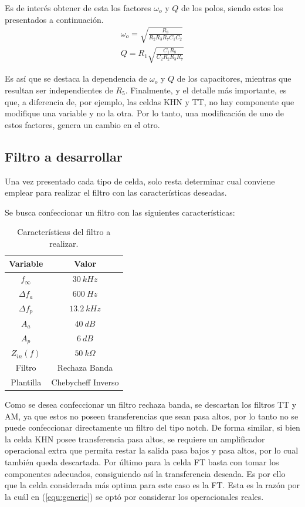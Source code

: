 Es de interés obtener de esta los factores $\omega_o$ y $Q$ de los polos, siendo estos los presentados a continuación.
\begin{equation}
\begin{split}
	\omega_o = \sqrt{\frac{R_8}{R_2 R_3 R_7 C_1 C_2}} \\
	Q = R_1 \sqrt{\frac{C_1 R_8}{C_2 R_2 R_3 R_7}} 
\end{split}
\label{equ:woq-ft}
\end{equation}

Es así que se destaca la dependencia de $\omega_o$ y $Q$ de los capacitores, mientras que resultan ser independientes de $R_5$. Finalmente, y el detalle más importante, es que, a diferencia de, por ejemplo, las celdas KHN y TT, no hay componente que modifique una variable y no la otra. Por lo tanto, una modificación de uno de estos factores, genera un cambio en el otro.

\subsection{Filtro a desarrollar}
Una vez presentado cada tipo de celda, solo resta determinar cual conviene emplear para realizar el filtro con las características deseadas.

Se busca confeccionar un filtro con las siguientes características:
\begin{table}[H]
\centering
\begin{tabular}{cc}
\hline
\textbf{Variable} & \textbf{Valor} \\
\hline
$f_\infty$ & $30 \ kHz$ \\
$\Delta f_a$ & $600 \ Hz$ \\
$\Delta f_p$ & $13.2 \ kHz$ \\
$A_a$ & $40 \ dB$ \\
$A_p$ & $6 \ dB$ \\
$Z_{in}(f)$ & $50 \ k\Omega$ \\
Filtro & Rechaza Banda \\
Plantilla & Chebycheff Inverso \\
\hline
\end{tabular}
\caption{Características del filtro a realizar.}
\label{tabla:caracteristicas1}
\end{table}

Como se desea confeccionar un filtro rechaza banda, se descartan los filtros TT y AM, ya que estos no poseen transferencias que sean pasa altos, por lo tanto no se puede confeccionar directamente un filtro del tipo notch. De forma similar, si bien la celda KHN posee transferencia pasa altos, se requiere un amplificador operacional extra que permita restar la salida pasa bajos y pasa altos, por lo cual también queda descartada. Por último para la celda FT basta con tomar los componentes adecuados, consiguiendo así la transferencia deseada. Es por ello que la celda considerada más optima para este caso es la FT. Esta es la razón por la cuál en (\ref{equ:generic}) se optó por considerar los operacionales reales.

